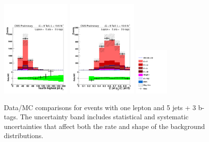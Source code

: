 \begin{figure}[hbtp]
\begin{center}
   \includegraphics[width=0.31\textwidth]{Figures/Analysis_2_Diagrams/LJ_plots_lep/5j3t/lep_jet_pt_4_5j3t_cumulative_wRatio_noLegend_lin.pdf}
   \includegraphics[width=0.31\textwidth]{Figures/Analysis_2_Diagrams/LJ_plots_lep/5j3t/lep_pt_all_jets_over_E_all_jets_5j3t_cumulative_wRatio_noLegend_lin.pdf}
   \includegraphics[width=0.15\textwidth]{Figures/Analysis_2_Diagrams/LJ_plots_lep/ttH_legend_1columns.pdf}
   \caption{Data/MC comparisons for events with one lepton and 5 jets + 3 b-tags.  The uncertainty band includes statistical and systematic uncertainties that affect both the rate and shape of the background distributions.}
   \label{fig:lj_input_II_5j3t}
 \end{center}
\end{figure}

\clearpage


